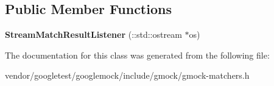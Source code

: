 \subsection*{Public Member Functions}
\begin{DoxyCompactItemize}
\item 
\mbox{\label{classtesting_1_1internal_1_1_stream_match_result_listener_a81985760741d818745237df002d65d04}} 
{\bfseries Stream\+Match\+Result\+Listener} (\+::std\+::ostream $\ast$os)
\end{DoxyCompactItemize}


The documentation for this class was generated from the following file\+:\begin{DoxyCompactItemize}
\item 
vendor/googletest/googlemock/include/gmock/gmock-\/matchers.\+h\end{DoxyCompactItemize}
